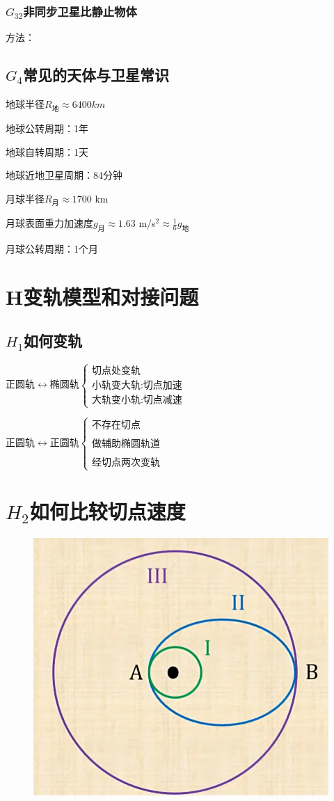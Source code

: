 \documentclass[lang=cn,10pt]{elegantbook}
\begin{document}
	       \subsubsection{$G_{32}$非同步卫星比静止物体}
	       方法：
	       \vspace{3cm}
	       
	       \subsection{$G_4$常见的天体与卫星常识}
	       
	       地球半径$R_\text{地}\approx6400km$
	       
	       地球公转周期：1年
	       
	       地球自转周期：1天
	       
	       地球近地卫星周期：84分钟
	       
	       月球半径$R_\text{月}\approx1700$ km
	       
	       月球表面重力加速度$g_\text{月}\approx1.63$ m/s$^2\approx\frac16g_\text{地}$
	       
	       月球公转周期：1个月
	       
	       \section{H变轨模型和对接问题}
	       \subsection{$H_1$如何变轨}
	       $\text{正圆轨}\longleftrightarrow\text{椭圆轨}\begin{cases}\text{切点处变轨}\\\text{小轨变大轨:切点加速}\\\text{大轨变小轨:切点减速}\end{cases}$
	       
	       $\text{正圆轨}\longleftrightarrow\text{正圆轨}\begin{cases}\text{不存在切点}\\\\\text{做辅助椭圆轨道}\\\\\text{经切点两次变轨}&\end{cases}$
	       
	       \section{$H_2$如何比较切点速度}
	       \begin{figure}[H]
	       	\centering
	       	\includegraphics[width=0.3\linewidth]{image/53}
	       \end{figure}
	       
\end{document}
